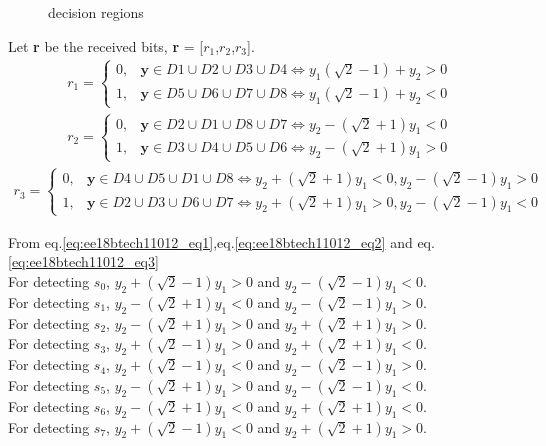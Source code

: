 \begin{enumerate}[label=\thesubsection.\arabic*.,ref=\thesubsection.\theenumi]
\begin{figure}[!ht]
\label{fig:ee18btech11012_fig2}
\caption{decision regions}
	
\end{figure}





Let \textbf{r} be the received bits, \textbf{r} = [$r_1$,$r_2$,$r_3$]. 
\begin{align}
    r_1 = 
    \begin{cases}
    0, &  \textbf{y} \in D1\cup D2\cup D3\cup D4 \Leftrightarrow  y_1(\sqrt{2}-1)+y_2>0\\
    1, &  \textbf{y} \in D5\cup D6\cup D7\cup D8 \Leftrightarrow y_1(\sqrt{2}-1)+y_2<0
    \end{cases}
    \label{eq:ee18btech11012_eq1}
\end{align}
\begin{align}
    r_2 = 
    \begin{cases}
    0, &  \textbf{y} \in D2\cup D1\cup D8\cup D7 \Longleftrightarrow  y_2 -(\sqrt{2}+1)y_1<0\\
    1, &  \textbf{y} \in D3\cup D4\cup D5\cup D6 \Longleftrightarrow  y_2 -(\sqrt{2}+1) y_1 > 0
    \end{cases}
    \label{eq:ee18btech11012_eq2}
\end{align}
\begin{align}
    r_3 = 
    \begin{cases}
    0, &  \textbf{y} \in D4\cup D5\cup D1\cup D8 \Longleftrightarrow  y_2 +(\sqrt{2}+1)y_1 < 0 ,  y_2 -(\sqrt{2}-1)y_1 > 0  \\
    1, &  \textbf{y} \in D2\cup D3\cup D6\cup D7 \Longleftrightarrow  y_2 +(\sqrt{2}+1)y_1 > 0 ,  y_2 -(\sqrt{2}-1)y_1 < 0 
    \end{cases}
    \label{eq:ee18btech11012_eq3}
\end{align}

From eq.\ref{eq:ee18btech11012_eq1},eq.\ref{eq:ee18btech11012_eq2} and eq.\ref{eq:ee18btech11012_eq3}
\\
For detecting $s_0$, $y_2+(\sqrt{2}-1)y_1>0$ and $y_2-(\sqrt{2}-1)y_1<0$.
\\
For detecting $s_1$, $y_2-(\sqrt{2}+1)y_1<0$ and $y_2-(\sqrt{2}-1)y_1>0$.
\\
For detecting $s_2$, $y_2-(\sqrt{2}+1)y_1>0$ and $y_2+(\sqrt{2}+1)y_1>0$.
\\
For detecting $s_3$, $y_2+(\sqrt{2}-1)y_1>0$ and $y_2+(\sqrt{2}+1)y_1<0$.
\\
For detecting $s_4$, $y_2+(\sqrt{2}-1)y_1<0$ and $y_2-(\sqrt{2}-1)y_1>0$.
\\
For detecting $s_5$, $y_2-(\sqrt{2}+1)y_1>0$ and $y_2-(\sqrt{2}-1)y_1<0$.
\\
For detecting $s_6$, $y_2-(\sqrt{2}+1)y_1<0$ and $y_2+(\sqrt{2}+1)y_1<0$.
\\
For detecting $s_7$, $y_2+(\sqrt{2}-1)y_1<0$ and $y_2+(\sqrt{2}+1)y_1>0$.





\end{enumerate}
